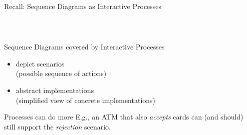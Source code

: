 \documentclass[aspectratio=169]{beamer}
\begin{document}
\begin{slide}{Recall: Sequence Diagrams as Interactive Processes}
  \label{slide:sd as proc}
  \centering

  ~\\
  
  \begin{columns}
  \end{columns}
\end{slide}


\begin{slide}{Sequence Diagrams covered by Interactive Processes}
  \begin{itemize}
    \item {} depict \alert{scenarios}
    \\(possible sequence of actions)
    \\[5mm]

    \item {} abstract \alert{implementations}
    \\(simplified view of concrete implementations)
  \end{itemize}

  \begin{block}{Processes can do more}
    E.g., an ATM that also \emph{accepts} cards can (and should) still support the \emph{rejection} scenario.
    \\[5mm]
  \end{block}
\end{slide}
\end{document}
